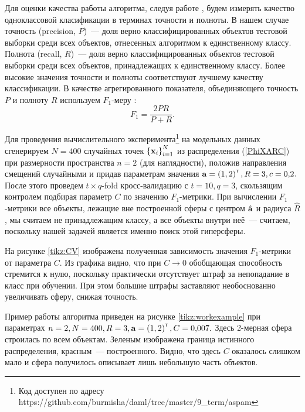 Для оценки качества работы алгоритма, следуя работе \cite{Romanenko2012}, будем измерять качество одноклассовой класификации в терминах точности и полноты.
В нашем случае точность (precision, $P$)~--- доля верно классифицированных объектов тестовой выборки среди всех объектов, отнесенных алгоритмом к единственному классу.
Полнота (recall, $R$)~--- доля верно классифицированных объектов тестовой выборки среди всех объектов, принадлежащих к единственному классу.
Более высокие значения точности и полноты соответствуют лучшему качеству классификации.
В качестве агрегированного показателя, объединяющего точность $P$ и полноту $R$ используем $F_1$-меру \cite{Rijsbergen1979}:
$$F_1 = \frac{2PR}{P+R}.$$

Для проведения вычислительного эксперимента\footnote{Код доступен по адресу \textsf{https://github.com/burmisha/daml/tree/master/9\_term/aspam}} на модельных данных
сгенерируем $N=400$ случайных точек $\left\{\boldsymbol{\mathbf{x}}_i\right\}_{i=1}^N$ из распределения (\ref{PhiXARC}) 
при размерности пространства $n=2$ (для наглядности), положив направления смещений случайными и придав параметрам значения $\boldsymbol{\mathbf{a}} = \left(1,2\right)^{\text{\tiny\sffamily\upshape\mdseries T}}, R = 3, c = 0{,}2.$
После этого проведем $t{\times}q$-fold кросс-валидацию с $t = 10, q = 3$, скользящим контролем подбирая параметр $C$ по значению $F_1$-метрики.
При вычислении $F_1$-метрики все объекты, лежащие вне построенной сферы с центром $\hat{\boldsymbol{\mathbf{a}}}$ и радиуса $\hat R$, мы считаем не принадлежащим классу, 
а все объекты внутри неё~--- считаем, поскольку нашей задачей является именно поиск этой гиперсферы.

На рисунке \ref{tikz:CV} изображена полученная зависимость значения $F_1$-метрики от параметра $C$.
Из графика видно, что при $C\to 0$ обобщающая способность стремится к нулю, поскольку практически отсутствует штраф за непопадание в класс при обучении.
При этом большие штрафы заставляют необоснованно увеличивать сферу, снижая точность.

Пример работы алгоритма приведен на рисунке \ref{tikz:workexample} при параметрах $n=2, N=400, R=3, \boldsymbol{\mathbf{a}} = \left(1,2\right)^{\text{\tiny\sffamily\upshape\mdseries T}}, C = 0{,}007.$ Здесь 2-мерная сфера строилась по всем объектам.
Зеленым изображена граница истинного распределения, красным~--- построенного.
Видно, что здесь $C$ оказалось слишком мало и сфера получилось описывает лишь небольшую часть объектов.


